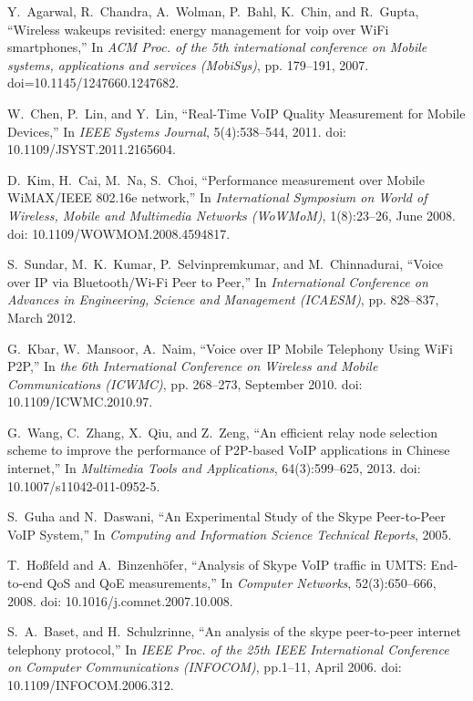 \documentclass[conference]{IEEEtran}
\begin{document}
\begin{thebibliography}{10}
Y.~Agarwal, R.~Chandra, A.~Wolman, P.~Bahl, K.~Chin, and R.~Gupta,
\newblock ``Wireless wakeups revisited: energy management for voip over WiFi
smartphones,''
\newblock In {\em ACM Proc. of the 5th international conference on Mobile
systems, applications and services (MobiSys)}, pp. 179--191, 2007.
doi=10.1145/1247660.1247682.

W.~Chen, P.~Lin, and Y.~Lin,
\newblock ``Real-Time VoIP Quality Measurement for Mobile Devices,''
\newblock In {\em IEEE Systems Journal}, 5(4):538--544, 2011.
doi: 10.1109/JSYST.2011.2165604.

D.~Kim, H.~Cai, M.~Na, S.~Choi,
\newblock ``Performance measurement over Mobile WiMAX/IEEE 802.16e network,''
\newblock In {\em International Symposium on World of Wireless, Mobile and
Multimedia Networks (WoWMoM)}, 1(8):23--26, June 2008.
doi: 10.1109/WOWMOM.2008.4594817.

S.~Sundar, M.~K.~Kumar, P.~Selvinpremkumar, and M.~Chinnadurai,
\newblock ``Voice over IP via Bluetooth/Wi-Fi Peer to Peer,''
\newblock In {\em International Conference on Advances in Engineering, Science
and Management (ICAESM)}, pp. 828--837, March 2012.

G.~Kbar, W.~Mansoor, A.~Naim,
\newblock ``Voice over IP Mobile Telephony Using WiFi P2P,''
\newblock In {\em the 6th International Conference on Wireless and Mobile
Communications (ICWMC)}, pp. 268--273, September 2010.
doi: 10.1109/ICWMC.2010.97.

G.~Wang, C.~Zhang, X.~Qiu, and Z.~Zeng,
\newblock ``An efficient relay node selection scheme to improve the performance
of P2P-based VoIP applications in Chinese internet,''
\newblock In {\em Multimedia Tools and Applications}, 64(3):599--625, 2013.
doi: 10.1007/s11042-011-0952-5.

S.~Guha and N.~Daswani,
\newblock ``An Experimental Study of the Skype Peer-to-Peer VoIP System,''
\newblock In {\em Computing and Information Science Technical
Reports}, 2005.

T.~Hoßfeld and A.~Binzenhöfer,
\newblock ``Analysis of Skype VoIP traffic in UMTS: End-to-end QoS and QoE
measurements,''
\newblock In {\em Computer Networks}, 52(3):650--666, 2008.
doi: 10.1016/j.comnet.2007.10.008.

S.~A.~Baset, and H.~Schulzrinne,
\newblock ``An analysis of the skype peer-to-peer internet telephony protocol,''
\newblock In {\em IEEE Proc. of the 25th IEEE International Conference
on Computer Communications (INFOCOM)}, pp.1--11, April 2006.
doi: 10.1109/INFOCOM.2006.312.



\end{thebibliography}
\end{document}
